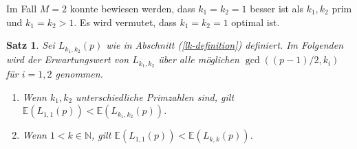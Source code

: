 \documentclass[a4paper, 10pt, ngerman]{article}
\newcommand{\E}{\mathbb{E}}
\newcommand{\N}{\mathbb{N}}
\newtheorem{theorem}{Satz}
\begin{document}
Im Fall $M = 2$ konnte bewiesen werden, dass $k_1 = k_2 = 1$ besser ist als $k_1, k_2$ prim und $k_1 = k_2 > 1$. Es wird vermutet, dass $k_1 = k_2 = 1$ optimal ist.

\begin{theorem}
    Sei $L_{k_1, k_2}(p)$ wie in Abschnitt (\ref{lk-definition}) definiert. Im Folgenden wird der Erwartungswert von $L_{k_1, k_2}$ über alle möglichen $\gcd((p - 1)/2, k_i)$ für $i = 1, 2$ genommen.
    \begin{enumerate}
        \item Wenn $k_1, k_2$ unterschiedliche Primzahlen sind, gilt $\E(L_{1, 1}(p)) < \E(L_{k_1, k_2}(p))$.
        \item Wenn $1 < k \in \N$, gilt $\E(L_{1, 1}(p)) < \E(L_{k, k}(p))$.
    \end{enumerate}
\end{theorem}
\end{document}
